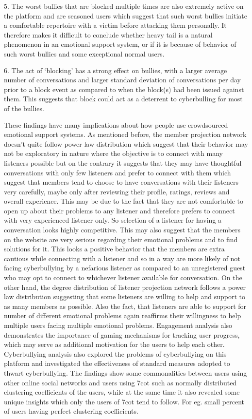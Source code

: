 5. The worst bullies that are blocked multiple times are also extremely active on the platform and are seasoned users which suggest that such worst bullies initiate a comfortable repertoire with a victim before attacking them personally. It therefore makes it difficult to conclude whether heavy tail is a natural phenomenon in an emotional support system, or if it is because of behavior of such worst bullies and some exceptional normal users. 

6. The act of ‘blocking’ has a strong effect on bullies, with a larger average number of conversations and larger standard deviation of conversations per day prior to a block event as compared to when the block(s) had been issued against them. This suggests that block could act as a deterrent to cyberbulling for most of the bullies. 


These findings have many implications about how people use crowdsourced emotional support systems. As mentioned before, the member projection network doesn't quite follow power law distribution which suggest that their behavior may not be exploratory in nature where the objective is to connect with many listeners possible but on the contrary it suggests that they may have thoughtful conversations with only few listeners and prefer to connect with them which suggest that members tend to choose to have conversations with their listeners very carefully, maybe only after reviewing their profile, ratings, reviews and overall experience. This may be due to the fact that they are not comfortable to open up about their problems to any listener and therefore prefers to connect with very experienced listener only. So selection of a listener for having a conversation looks highly competitive. This may also suggest that the members on the website are very serious regarding their emotional problems and to find solutions for it. This looks a positive behavior that the members are extra cautious while connecting with a listener and so in a way are more likely of not facing cyberbullying by a nefarious listener as compared to an unregistered guest who may opt to connect to whichever listener available for conversation. On the other hand, the degree distribution of listener projection network follows a power law distribution suggesting that some listeners are willing to help and support to as many members as possible. Also the fact, that listeners are able to support for number of different emotional problems again reaffirms their willingness to help multiple users facing multiple emotional problems. Engagement analysis also demonstrates the importance of gaming mechanisms for tracking user progress, which may serve as additional motivation for the users to help each other. Cyberbullying analysis also explored the problems of cyberbullying on this platform and investigated the effectiveness of standard measures adopted to thwart cyberbullying. The findings show some commonalities between users using other online social networks and users using 7cot such as normally distributed clustering coefficients of the users, while at the same time it also revealed some unique insights which only the users of 7cot tend to follow. For eg. small percent of users having perfect clustering coefficients. 

